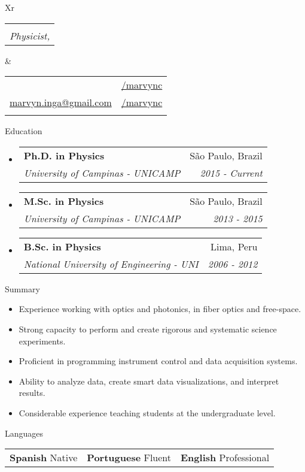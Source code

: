 \documentclass[letterpaper, 11pt]{article}[leftmargin=*]
\makeatletter
\def \fullname {\Huge Marvyn Inga}
\def \subtitle {Physicist, \faMale}
\def \linkedinicon {\faLinkedin}
\def \linkedinlink {https://www.linkedin.com/in/marvync/}
\def \linkedintext {/marvync}
\def \phoneicon {\faPhone}
\def \phonetext {+51-970230009}
\def \emailicon {\faEnvelope}
\def \emaillink {mailto:marvyn.inga@gmail.com}
\def \emailtext {marvyn.inga@gmail.com}
\def \githubicon {\faGithub}
\def \githublink {https://github.com/marvync}
\def \githubtext {/marvync}
\def \headertype {\doublecol} %
\def \linkedin {\linkedinicon \hspace{3pt}\href{\linkedinlink}{\linkedintext}}
\def \phone {\phoneicon \hspace{3pt}{ \phonetext}}
\def \email {\emailicon \hspace{3pt}\href{\emaillink}{\emailtext}}
\def \github {\githubicon \hspace{3pt}\href{\githublink}{\githubtext}}
\renewcommand{\section}[2]{
  \colorbox{boxcol}{\color{secondary}\raggedbottom\normalsize{#1}{\hspace{2pt}#2}}
}
\newcommand{\resumeEntryStart}{\begin{itemize}[leftmargin=2.5mm]\itemsep8pt}
\newcommand{\resumeEntryEnd}{\end{itemize}}
\newcommand{\resumeItemListStart}{\begin{itemize}[leftmargin=4.5mm]\itemsep-3pt}
\newcommand{\resumeItemListEnd}{\end{itemize}}
\newcommand{\resumeItem}[1]{
  \item\small{
    {#1}
  }
}
\newcommand{\resumeEntryTSDL}[4]{
  \item[]
    \begin{tabularx}{0.98\textwidth}{X@{\hspace{60pt}}r}
      \textbf{\color{primary}#1} & {\firabook\color{accent}\small#2} \\
      \vspace{-0.35cm}
      \textit{\color{accent}\small#3} & \textit{\color{accent}\small#4} \\
    \end{tabularx}\vspace{-0.35cm}
}
\newcommand{\resumeEntryS}[2]{
  \item[]\small{
    \textbf{\color{primary}#1 }{ #2 }
  }
}
\newcommand{\triplecol}[3]{
	\vspace{-0.3cm}
	\begin{tabularx}{\textwidth}{XXX}
	{\small#1} & {\small#2} & {\small#3}
	\end{tabularx}
}
\newcommand{\doublecol}[6]{
  \begin{tabularx}{\textwidth}{Xr}
    {
      \begin{tabular}[c]{l}
        \fontsize{35}{45}\selectfont{\color{primary}{{\textbf{\fullname}}}} \\
        {\textit{\subtitle}} %
      \end{tabular}
    } & {
      \begin{tabular}[c]{l@{\hspace{1.5em}}l}
        {\small#4} & {\small#1} \\
        {\small#5} & {\small#2} \\
        {\small#6} & {\small#3}
      \end{tabular}
    }
  \end{tabularx}
\vspace{0.3cm}
}
\newcommand{\singlecol}[6]{
  \begin{tabularx}{\textwidth}{Xr}
    {
      \begin{tabular}[b]{l}
        \fontsize{35}{45}\selectfont{\color{primary}{{\textbf{\fullname}}}} \\
        {\textit{\subtitle}} %
      \end{tabular}
    } & {
      \begin{tabular}[c]{l}
        {\small#1} \\
        {\small#2} \\
        {\small#3} \\
        {\small#4} \\
        {\small#5} \\
        {\small#6}
      \end{tabular}
    }
  \end{tabularx}
}
\makeatother
\begin{document}


\headertype{\linkedin}{\github}{}{\phone}{\email}{} %

\section{\faGraduationCap}{Education}
\resumeEntryStart
	\small
	\resumeEntryTSDL
    {Ph.D. in Physics}{\footnotesize São Paulo, Brazil}
	{\footnotesize University of Campinas - UNICAMP}{\footnotesize 2015 - Current}
	\resumeEntryTSDL
	{M.Sc. in Physics}{\footnotesize São Paulo, Brazil}
	{\footnotesize University of Campinas - UNICAMP}{\footnotesize 2013 - 2015}
	\resumeEntryTSDL
	{B.Sc. in Physics}{\footnotesize Lima, Peru}
	{\footnotesize National University of Engineering - UNI}{\footnotesize 2006 - 2012}
\resumeEntryEnd
\vspace{0.1cm}
\section{\faFolderOpen}{Summary}
\resumeItemListStart
\resumeItem {Experience working with optics and photonics, in fiber optics and free-space.}
\resumeItem {Strong capacity to perform and create rigorous and systematic science experiments.}
\resumeItem {Proficient in programming instrument control and data acquisition systems.}
\resumeItem{Ability to analyze data, create smart data visualizations, and interpret results.}
\resumeItem {Considerable experience teaching students at the undergraduate level.}
\resumeItemListEnd

\section{\faComment}{Languages}
\vspace{-0.2cm}
\resumeEntryStart
	\small
	\triplecol{\resumeEntryS{Spanish}{Native}}{\resumeEntryS{Portuguese}{Fluent}}{\resumeEntryS{English} {Professional}}
\resumeEntryEnd
\end{document}
